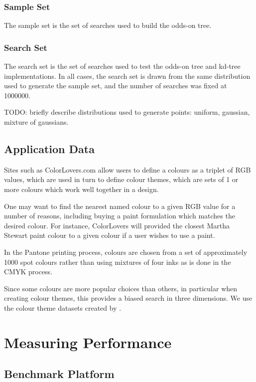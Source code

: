 \documentclass[mcs]{scsthesis}
\begin{document}
\subsubsection{Sample Set}

The sample set is the set of searches used to build the odds-on tree.

\subsubsection{Search Set}

The search set is the set of searches used to  test the odds-on tree and
kd-tree implementations.  In all cases, the search set is drawn from the same
distribution used to generate the sample set, and the number of searches was
fixed at 1000000. 

TODO: briefly describe distributions used to generate points: uniform, gaussian,
mixture of gaussians.

\subsection{Application Data}

Sites such as ColorLovers.com \cite{colorlovers} allow users to define a
colours as a triplet of RGB values, which are used in turn to define colour
themes, which are sets of 1 or more colours which work well together in a
design.

One may want to find the nearest named colour to a given RGB value for
a number of reasons, including buying a paint formulation which matches the
desired colour.  For instance, ColorLovers will provided the closest Martha
Stewart paint colour to a given colour if a user wishes to use a paint.

In the Pantone \cite{pantone} printing process, colours are chosen from a set of
approximately 1000 spot colours rather than using mixtures of four inks as is
done in the CMYK process.

Since some colours are more popular choices than others, in particular when
creating colour themes, this provides a biased search in three dimensions. We
use the colour theme datasets created by \cite{colorthemes}.

\section{Measuring Performance}

\subsection{Benchmark Platform}
\end{document}
